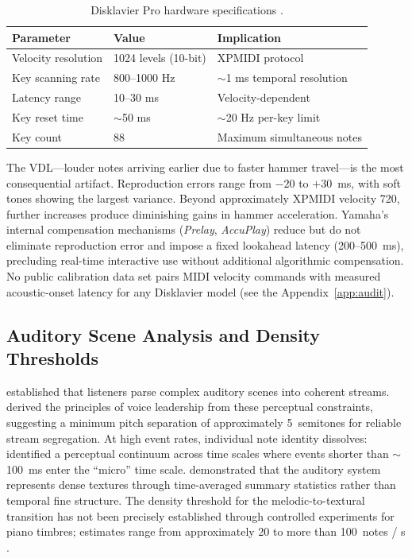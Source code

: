 \documentclass[a4paper]{article}
\theoremstyle{definition}
\theoremstyle{remark}
\begin{document}
\begin{table}[htbp]
\centering
\caption{Disklavier Pro hardware specifications \citep{goebl2003measurement}.}
\label{tab:hardware}
\begin{tabular}{@{}lll@{}} \toprule
\textbf{Parameter} & \textbf{Value} & \textbf{Implication} \\ \midrule
Velocity resolution & 1024 levels (10-bit) & XPMIDI protocol \\
Key scanning rate & 800--1000 Hz & $\sim$1 ms temporal resolution \\
Latency range & 10--30 ms & Velocity-dependent \\
Key reset time & $\sim$50 ms & $\sim$20 Hz per-key limit \\
Key count & 88 & Maximum simultaneous notes \\ \bottomrule
\end{tabular}
\end{table}

The VDL---louder notes arriving earlier due to faster hammer travel---is the most consequential artifact. Reproduction errors range from $-20$ to $+30$~ms, with soft tones showing the largest variance. Beyond approximately XPMIDI velocity 720, further increases produce diminishing gains in hammer acceleration. Yamaha's internal compensation mechanisms (\emph{Prelay}, \emph{AccuPlay}) reduce but do not eliminate reproduction error and impose a fixed lookahead latency (200--500~ms), precluding real-time interactive use without additional algorithmic compensation. No public calibration data set pairs MIDI velocity commands with measured acoustic-onset latency for any Disklavier model (see the Appendix~\ref{app:audit}).

\subsection{Auditory Scene Analysis and Density Thresholds}
\label{sec:bg_asa}

\citet{bregman1994auditory} established that listeners parse complex auditory scenes into coherent streams. \citet{huron2001tone} derived the principles of voice leadership from these perceptual constraints, suggesting a minimum pitch separation of approximately 5~semitones for reliable stream segregation. At high event rates, individual note identity dissolves: \citet{roads2004microsound} identified a perceptual continuum across time scales where events shorter than $\sim$100~ms enter the ``micro'' time scale. \citet{mcdermott2013summary} demonstrated that the auditory system represents dense textures through time-averaged summary statistics rather than temporal fine structure. The density threshold for the melodic-to-textural transition has not been precisely established through controlled experiments for piano timbres; estimates range from approximately 20 to more than 100~notes / s \citep{roads2004microsound, bregman1994auditory}.
\end{document}
